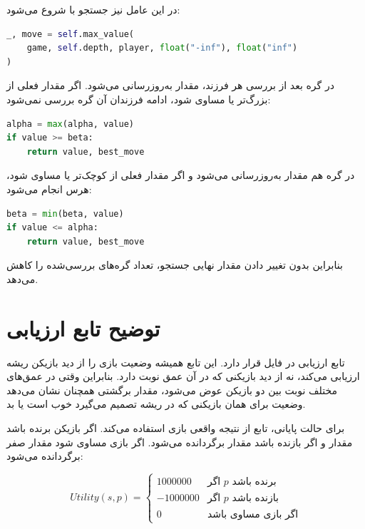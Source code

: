 \documentclass[10.5pt]{exam}
\begin{document}
در این عامل نیز جستجو با
شروع می‌شود:

\begin{latin}
\begin{lstlisting}[language=Python]
_, move = self.max_value(
    game, self.depth, player, float("-inf"), float("inf")
)
\end{lstlisting}
\end{latin}

در گره
بعد از بررسی هر فرزند، مقدار
به‌روزرسانی می‌شود. اگر مقدار فعلی از
بزرگ‌تر یا مساوی شود، ادامه فرزندان آن گره بررسی نمی‌شود:

\begin{latin}
\begin{lstlisting}[language=Python]
alpha = max(alpha, value)
if value >= beta:
    return value, best_move
\end{lstlisting}
\end{latin}

در گره
هم مقدار
به‌روزرسانی می‌شود و اگر مقدار فعلی از
کوچک‌تر یا مساوی شود، هرس انجام می‌شود:

\begin{latin}
\begin{lstlisting}[language=Python]
beta = min(beta, value)
if value <= alpha:
    return value, best_move
\end{lstlisting}
\end{latin}

بنابراین
بدون تغییر دادن مقدار نهایی جستجو، تعداد گره‌های بررسی‌شده را کاهش می‌دهد.

\section{توضیح تابع ارزیابی}
تابع ارزیابی در فایل
قرار دارد. این تابع همیشه وضعیت بازی را از دید بازیکن ریشه ارزیابی می‌کند، نه از دید بازیکنی که در آن عمق نوبت دارد. بنابراین وقتی در عمق‌های مختلف نوبت بین دو بازیکن عوض می‌شود، مقدار برگشتی همچنان نشان می‌دهد وضعیت برای همان بازیکنی که در ریشه تصمیم می‌گیرد خوب است یا بد.

برای حالت پایانی، تابع از نتیجه واقعی بازی استفاده می‌کند. اگر بازیکن برنده باشد مقدار
و اگر بازنده باشد مقدار
برگردانده می‌شود. اگر بازی مساوی شود مقدار صفر برگردانده می‌شود:

\[
    Utility(s,p) =
    \begin{cases}
        1000000 & \text{اگر } p \text{ برنده باشد}\\
        -1000000 & \text{اگر } p \text{ بازنده باشد}\\
        0 & \text{اگر بازی مساوی باشد}
    \end{cases}
\]
\end{document}
